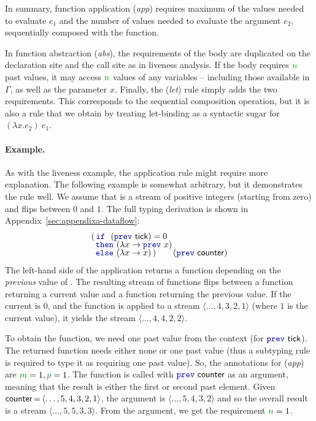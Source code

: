 In summary, function application (\emph{app}) requires maximum of the values needed to evaluate 
$e_1$ and the number of values needed to evaluate the argument $e_2$, sequentially composed with
the function. 

In function abstraction (\emph{abs}), the requirements of the body are duplicated on the declaration site
and the call site as in liveness analysis. If the body requires $\cclrd{n}$ past values, it may access
$\cclrd{n}$ values of any variables -- including those available in $\Gamma$, as well as the parameter
$x$. Finally, the (\emph{let}) rule simply adds the two requirements. This corresponds to the sequential
composition operation, but it is also a rule that we obtain by treating let-binding as a syntactic 
sugar for $(\lambda x.e_2)~e_1$.


\paragraph{Example.} 
As with the liveness example, the application rule might require more explanation. The following 
example is somewhat arbitrary, but it demonstrates the rule well. We assume that  
is a stream of positive integers (starting from zero) and  flips between $0$ and $1$.
The full typing derivation is shown in Appendix~\ref{sec:appendixa-dataflow}:
%
\begin{equation*}
\begin{array}{l}
(\,   \kvd{if}~~(\kvd{prev}~\ident{tick})=0\\[-0.25em]
\,\,\, \kvd{then}~(\lambda x \rightarrow \kvd{prev}~x)\\[-0.25em]
\,\,\, \kvd{else}~(\lambda x \rightarrow x) \,)\qquad(\kvd{prev}~\ident{counter})
\end{array}
\end{equation*}
%
The left-hand side of the application returns a function depending on the \emph{previous}
value of . The resulting stream of functions flips between a function returning
a current value and a function returning the previous value. If the current  is 0, and
the function is applied to a stream $\langle{\ldots,4,3,2,1}\rangle$ 
(where $1$ is the current value), it yields the stream $\langle{\ldots,4,4,2,2}\rangle$. 

To obtain the function, we need one past value from the context (for $\kvd{prev}~\ident{tick}$). The 
returned function needs either none or one past value (thus a subtyping rule is required to type 
it as requiring one past value). So, the annotations for (\emph{app}) are $\cclrd{m}=1, \cclrd{p}=1$.
The function is called with $\kvd{prev}~\ident{counter}$ as an argument, meaning that the result
is either the first or second past element. Given 
$\textnormal{\sffamily counter}\hspace{-0.1em}=\hspace{-0.1em}\langle{\ldots,5,4,3,2,1}\rangle$, the argument 
is $\langle{\ldots,5,4,3,2}\rangle$ and so the overall result is a stream $\langle{\ldots,5,5,3,3}\rangle$.
From the argument, we get the requirement $\cclrd{n}=1$.

